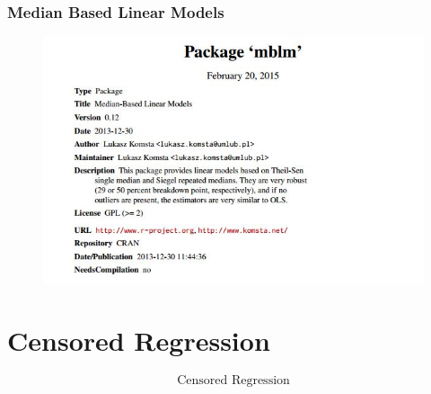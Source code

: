 \documentclass{beamer}
\begin{document}
\begin{frame}
	\frametitle{Median Based Linear Models}
	\begin{figure}
\centering
\includegraphics[width=1.1\linewidth]{images/theilRegression}
\caption{}
\label{fig:theilRegression}
\end{figure}

\end{frame}
\section{Censored Regression}
\begin{frame}
	\LARGE
	\[\mbox{Censored Regression}\]
\end{frame}
%
%	
\end{document}
